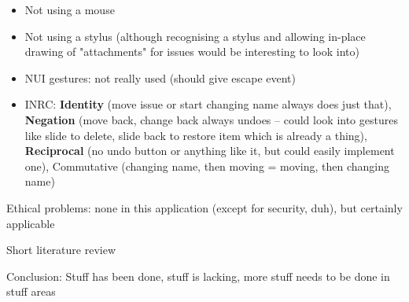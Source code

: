 \begin{itemize}
  \item Not using a mouse
  \item Not using a stylus (although recognising a stylus and allowing in-place drawing of "attachments" for issues would be interesting to look into)
  \item NUI gestures: not really used (should give escape event)
  \item INRC: \textbf{Identity} (move issue or start changing name always does just that), \textbf{Negation} (move back, change back always undoes – could look into gestures like slide to delete, slide back to restore item which is already a thing), \textbf{Reciprocal} (no undo button or anything like it, but could easily implement one), Commutative (changing name, then moving = moving, then changing name) %
\end{itemize}

Ethical problems: none in this application (except for security, duh), but certainly applicable %

Short literature review %

Conclusion: Stuff has been done, stuff is lacking, more stuff needs to be done in stuff areas